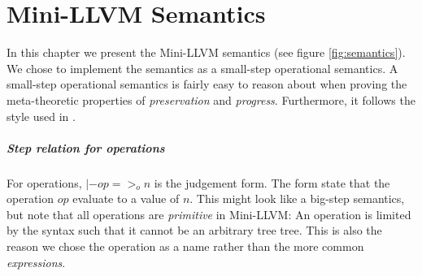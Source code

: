 \documentclass[a4paper, oneside, 10pt, draft]{memoir}
\begin{document}
\chapter{Mini-LLVM Semantics}

In this chapter we present the Mini-LLVM semantics (see figure
\ref{fig:semantics}). We chose to implement the semantics as a
small-step operational semantics. A small-step operational semantics
is fairly easy to reason about when proving the meta-theoretic
properties of \emph{preservation} and \emph{progress}. Furthermore, it
follows the style used in \cite{pierce:2002:types}.

\paragraph{Step relation for operations}

\newcommand{\eop}{=>_{o}} For operations, $\boxed{|- op \eop n}$ is
the judgement form. The form state that the operation $op$ evaluate to a
value of $n$. This might look like a big-step semantics, but note that
all operations are \emph{primitive} in Mini-LLVM: An operation is
limited by the syntax such that it cannot be an arbitrary tree
tree. This is also the reason we chose the operation as a name rather
than the more common \emph{expressions}.
\end{document}
